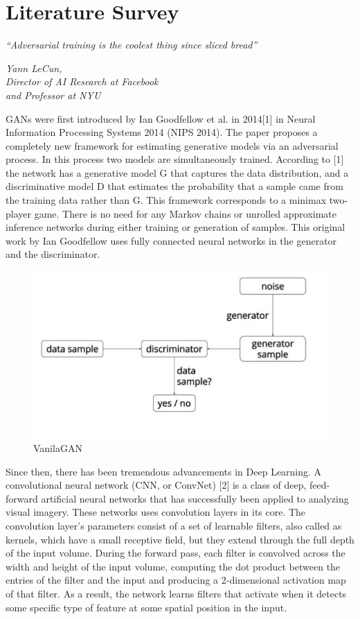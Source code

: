 \chapter{Literature Survey}\label{ch:literature_survey}
\epigraph{\textit{\Large “Adversarial training is the coolest thing since sliced bread”}}{\textit{ \large Yann LeCun,\\ Director of AI Research at Facebook \\and Professor at NYU}}
GANs were first introduced by Ian Goodfellow et al. in 2014[1] in Neural Information Processing Systems 2014 (NIPS 2014). The paper proposes a completely new framework for estimating generative models via an adversarial process. In this process two models are simultaneously trained. According to [1] the network has a generative model G that captures the data distribution, and a discriminative model D that estimates the probability that a sample came from the training data rather than G. This framework corresponds to a minimax two-player game. There is no need for any Markov chains or unrolled approximate inference networks during either training or generation of samples. This original work by Ian Goodfellow uses fully connected neural networks in the generator and the discriminator.\par\bigskip
\begin{figure}[H]
\centering\includegraphics[width=.7\textwidth]{images/vanilaGAN.jpg}
\caption{VanilaGAN}
\end{figure}
Since then, there has been tremendous advancements in Deep Learning. A convolutional neural network (CNN, or ConvNet) [2] is a class of deep, feed-forward artificial neural networks that has successfully been applied to analyzing visual imagery. These networks uses convolution layers in its core. The convolution layer's parameters consist of a set of learnable filters, also called as kernels, which have a small receptive field, but they extend through the full depth of the input volume. During the forward pass, each filter is convolved across the width and height of the input volume, computing the dot product between the entries of the filter and the input and producing a 2-dimensional activation map of that filter. As a result, the network learns filters that activate when it detects some specific type of feature at some spatial position in the input.\par\bigskip
